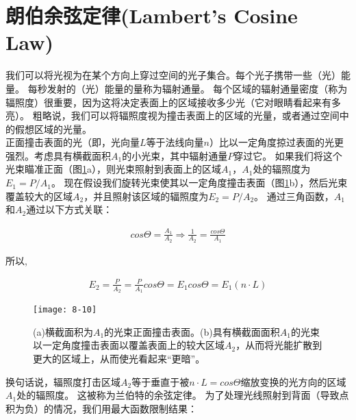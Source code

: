 \section{朗伯余弦定律(Lambert’s Cosine Law)}
\begin{flushleft}
我们可以将光视为在某个方向上穿过空间的光子集合。每个光子携带一些（光）能量。 每秒发射的（光）能量的量称为辐射通量。 每个区域的辐射通量密度（称为辐照度）很重要，因为这将决定表面上的区域接收多少光（它对眼睛看起来有多亮）。 粗略说，我们可以将辐照度视为撞击表面上的区域的光量，或者通过空间中的假想区域的光量。\\

正面撞击表面的光（即，光向量$L$等于法线向量$n$）比以一定角度掠过表面的光更强烈。考虑具有横截面积$A_{1}$的小光束，其中辐射通量$P$穿过它。 如果我们将这个光束瞄准正面（图\ref{fig:8-10}a），则光束照射到表面上的区域$A_{1}$，$A_{1}$处的辐照度为$E_{1}=P/A_{1}$。 现在假设我们旋转光束使其以一定角度撞击表面（图\ref{fig:8-10}b），然后光束覆盖较大的区域$A_{2}$，并且照射该区域的辐照度为$E_{2}=P/A_{2}$。 通过三角函数，$A_{1}$和$A_{2}$通过以下方式关联：\\
\end{flushleft}

\begin{align*}
cos\Theta = \frac{A_{1}}{A_{2}}\Rightarrow \frac{1}{A_{2}}=\frac{cos\Theta}{A_{1}}
\end{align*}

\begin{flushleft}
所以,\\
\end{flushleft}

\begin{align*}
E_{2}=\frac{P}{A_{2}}=\frac{P}{A_{1}}cos\Theta=E_{1}cos\Theta=E_{1}(n\cdot L)
\end{align*}

\begin{figure}[h]
    \texttt{[image: 8-10]}
    \centering
    \caption{(a)横截面积为$A_{1}$的光束正面撞击表面。(b)具有横截面面积$A_{1}$的光束以一定角度撞击表面以覆盖表面上的较大区域$A_{2}$，从而将光能扩散到更大的区域上，从而使光看起来“更暗”。}
    \label{fig:8-10}
\end{figure}

\begin{flushleft}
换句话说，辐照度打击区域$A_{2}$等于垂直于被$n\cdot L=cos\Theta$缩放变换的光方向的区域$A_{1}$处的辐照度。 这被称为兰伯特的余弦定律。 为了处理光线照射到背面（导致点积为负）的情况，我们用最大函数限制结果：\\
\end{flushleft}


